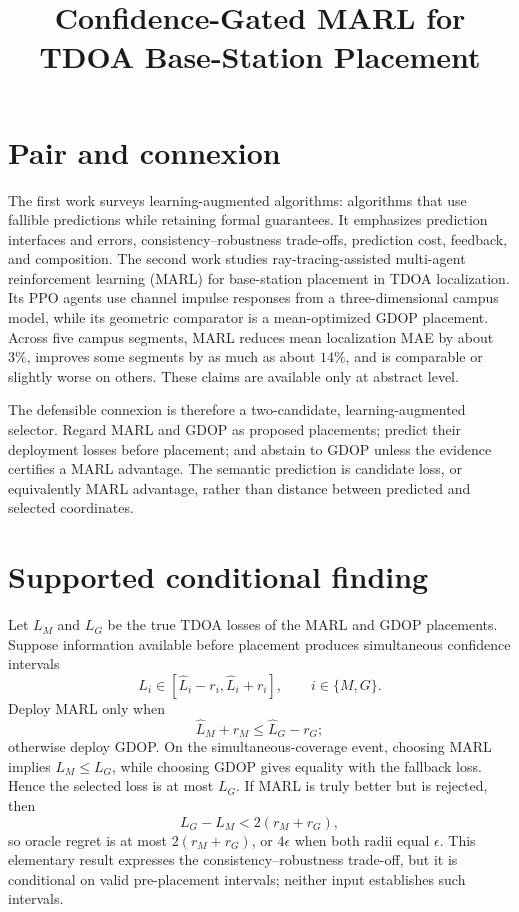 \documentclass{article}
\title{Confidence-Gated MARL for TDOA Base-Station Placement}
\begin{document}
\maketitle

\section{Pair and connexion}

The first work surveys learning-augmented algorithms: algorithms that use fallible predictions while retaining formal guarantees.  It emphasizes prediction interfaces and errors, consistency--robustness trade-offs, prediction cost, feedback, and composition.  The second work studies ray-tracing-assisted multi-agent reinforcement learning (MARL) for base-station placement in TDOA localization.  Its PPO agents use channel impulse responses from a three-dimensional campus model, while its geometric comparator is a mean-optimized GDOP placement.  Across five campus segments, MARL reduces mean localization MAE by about \(3\%\), improves some segments by as much as about \(14\%\), and is comparable or slightly worse on others.  These claims are available only at abstract level. 

The defensible connexion is therefore a two-candidate, learning-augmented selector.  Regard MARL and GDOP as proposed placements; predict their deployment losses before placement; and abstain to GDOP unless the evidence certifies a MARL advantage.  The semantic prediction is candidate loss, or equivalently MARL advantage, rather than distance between predicted and selected coordinates. 

\section{Supported conditional finding}

Let \(L_M\) and \(L_G\) be the true TDOA losses of the MARL and GDOP placements.  Suppose information available before placement produces simultaneous confidence intervals
\[
  L_i \in [\widehat L_i-r_i,\widehat L_i+r_i],
  \qquad i\in\{M,G\}.
\]
Deploy MARL only when
\[
  \widehat L_M+r_M \leq \widehat L_G-r_G;
\]
otherwise deploy GDOP.  On the simultaneous-coverage event, choosing MARL implies \(L_M\leq L_G\), while choosing GDOP gives equality with the fallback loss.  Hence the selected loss is at most \(L_G\).  If MARL is truly better but is rejected, then
\[
  L_G-L_M < 2(r_M+r_G),
\]
so oracle regret is at most \(2(r_M+r_G)\), or \(4\epsilon\) when both radii equal \(\epsilon\).  This elementary result expresses the consistency--robustness trade-off, but it is conditional on valid pre-placement intervals; neither input establishes such intervals. 
\end{document}
